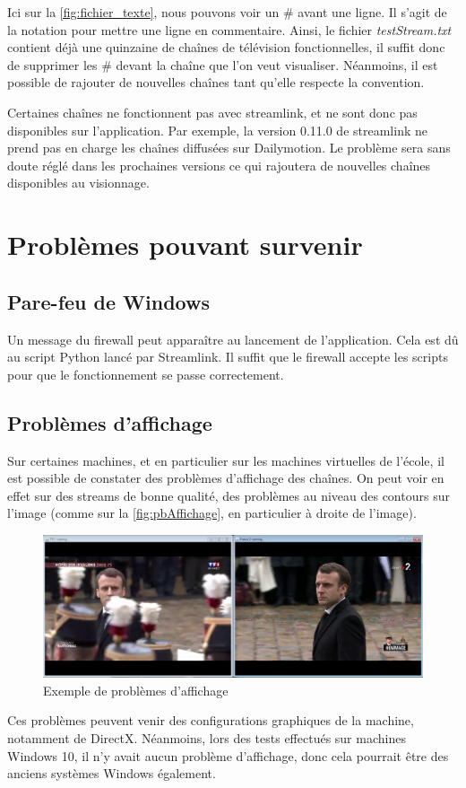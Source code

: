 \documentclass{polytech/polytech}
\begin{document}
Ici sur la \autoref{fig:fichier_texte}, nous pouvons voir un \# avant une ligne. Il s'agit de la notation pour mettre une ligne en commentaire. Ainsi, le fichier \textit{testStream.txt} contient déjà une quinzaine de chaînes de télévision fonctionnelles, il suffit donc de supprimer les \# devant la chaîne que l'on veut visualiser. Néanmoins, il est possible de rajouter de nouvelles chaînes tant qu'elle respecte la convention. 

Certaines chaînes ne fonctionnent pas avec streamlink, et ne sont donc pas disponibles sur l'application. Par exemple, la version 0.11.0 de streamlink ne prend pas en charge les chaînes diffusées sur Dailymotion. Le problème sera sans doute réglé dans les prochaines versions ce qui rajoutera de nouvelles chaînes disponibles au visionnage. 

\section{Problèmes pouvant survenir}


\subsection{Pare-feu de Windows}

Un message du firewall peut apparaître au lancement de l'application. Cela est dû au script Python lancé par Streamlink. Il suffit que le firewall accepte les scripts pour que le fonctionnement se passe correctement. 


\subsection{Problèmes d'affichage}

Sur certaines machines, et en particulier sur les machines virtuelles de l'école, il est possible de constater des problèmes d'affichage des chaînes. On peut voir en effet sur des streams de bonne qualité, des problèmes au niveau des contours sur l'image (comme sur la \autoref{fig:pbAffichage}, en particulier à droite de l'image).


\begin{figure}
	\includegraphics[scale=0.37]{images/imageQualite.png}
	\caption{Exemple de problèmes d'affichage}
	\label{fig:pbAffichage}
\end{figure}


Ces problèmes peuvent venir des configurations graphiques de la machine, notamment de DirectX. Néanmoins, lors des tests effectués sur machines Windows 10, il n'y avait aucun problème d'affichage, donc cela pourrait être des anciens systèmes Windows également.
\end{document}
